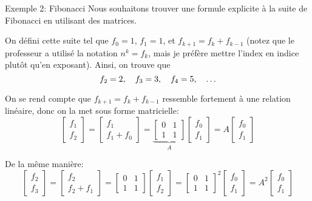 \documentclass[a4paper]{article}
\begin{document}
\begin{parag}{Exemple 2: Fibonacci}
    Nous souhaitons trouver une formule explicite à la suite de Fibonacci en utilisant des matrices.

    On défini cette suite tel que $f_0 = 1$, $f_1 = 1$, et $f_{k+1} = f_k + f_{k-1}$ (notez que le professeur a utilisé la notation $n^k = f_k$, mais je préfère mettre l'index en indice plutôt qu'en exposant). Ainsi, on trouve que 
    \[f_2 = 2, \quad f_3 = 3, \quad f_4 = 5, \quad \ldots\]

    On se rend compte que $f_{k+1} = f_k + f_{k-1}$ ressemble fortement à une relation linéaire, donc on la met sous forme matricielle: 
    \[\begin{bmatrix} f_1 \\ f_2 \end{bmatrix} = \begin{bmatrix} f_1 \\ f_1 + f_0 \end{bmatrix} = \underbrace{\begin{bmatrix} 0 & 1 \\ 1 & 1 \end{bmatrix}}_{A} \begin{bmatrix} f_0 \\ f_1 \end{bmatrix} = A \begin{bmatrix} f_0 \\ f_1 \end{bmatrix} \]
    
    De la même manière: 
    \[\begin{bmatrix} f_2 \\ f_3 \end{bmatrix} = \begin{bmatrix} f_2 \\ f_2 + f_1 \end{bmatrix} = \begin{bmatrix} 0 & 1 \\ 1 & 1 \end{bmatrix} \begin{bmatrix} f_1 \\ f_2 \end{bmatrix} = \begin{bmatrix} 0 & 1 \\ 1 & 1 \end{bmatrix}^2 \begin{bmatrix} f_0 \\ f_1 \end{bmatrix} = A^2 \begin{bmatrix} f_0 \\ f_1 \end{bmatrix} \]
    

\end{parag}
\end{document}
